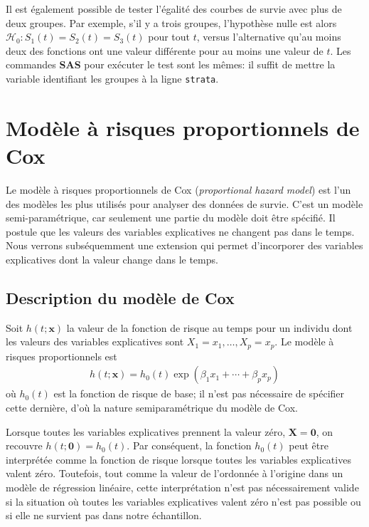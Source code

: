 \documentclass[
  11pt,
  letterpaper,
]{book}
\theoremstyle{definition}
\theoremstyle{definition}
\theoremstyle{definition}
\theoremstyle{remark}
\begin{document}
Il est également possible de tester l'égalité des courbes de survie avec plus de deux groupes. Par exemple, s'il y a trois groupes, l'hypothèse nulle est alors \(\mathcal{H}_0: S_1(t)=S_2(t)=S_3(t)\) pour tout \(t\), versus l'alternative qu'au moins deux des fonctions ont une valeur différente pour au moins une valeur de \(t\). Les commandes \textbf{SAS} pour exécuter le test sont les mêmes: il suffit de mettre la variable identifiant les groupes à la ligne \texttt{strata}.

\hypertarget{moduxe8le-uxe0-risques-proportionnels-de-cox}{%
\section{Modèle à risques proportionnels de Cox}\label{moduxe8le-uxe0-risques-proportionnels-de-cox}}

Le modèle à risques proportionnels de Cox (\emph{proportional hazard model}) est l'un des modèles les plus utilisés pour analyser des données de survie. C'est un modèle semi-paramétrique, car seulement une partie du modèle doit être spécifié. Il postule que les valeurs des variables explicatives ne changent pas dans le temps. Nous verrons subséquemment une extension qui permet d'incorporer des variables explicatives dont la valeur change dans le temps.

\hypertarget{description-du-moduxe8le-de-cox}{%
\subsection{Description du modèle de Cox}\label{description-du-moduxe8le-de-cox}}

Soit \(h(t; \boldsymbol{x})\) la valeur de la fonction de risque au temps pour un individu dont les valeurs des variables explicatives sont \(X_1=x_1, \ldots, X_p=x_p\). Le modèle à risques proportionnels est
\begin{align*}
h(t; \boldsymbol{x}) = h_0(t)\exp(\beta_1x_1 + \cdots + \beta_p x_p)
\end{align*}
où \(h_0(t)\) est la fonction de risque de base; il n'est pas nécessaire de spécifier cette dernière, d'où la nature semiparamétrique du modèle de Cox.

Lorsque toutes les variables explicatives prennent la valeur zéro, \(\boldsymbol{X}=\boldsymbol{0}\), on recouvre \(h(t; \boldsymbol{0})= h_0(t)\). Par conséquent, la fonction \(h_0(t)\) peut être interprétée comme la fonction de risque lorsque toutes les variables explicatives valent zéro. Toutefois, tout comme la valeur de l'ordonnée à l'origine dans un modèle de régression linéaire, cette interprétation n'est pas nécessairement valide si la situation où toutes les variables explicatives valent zéro n'est pas possible ou si elle ne survient pas dans notre échantillon.
\end{document}

